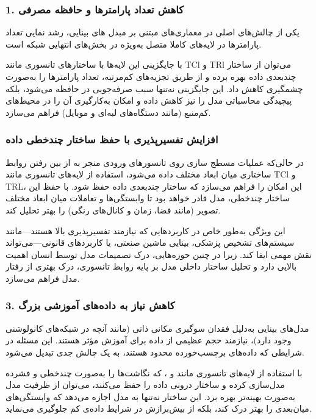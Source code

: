 \subsubsection*{1. \textbf{کاهش تعداد پارامترها و حافظه مصرفی}}

یکی از چالش‌های اصلی در معماری‌های مبتنی بر مبدل های بینایی، رشد نمایی تعداد پارامترها در لایه‌های کاملا متصل  به‌ویژه در بخش‌های انتهایی شبکه است.

با جایگزینی این لایه‌ها با ساختارهای تانسوری مانند TCl و TRl می‌توان از ساختار چندبعدی داده بهره برده و از طریق تجزیه‌های کم‌مرتبه، تعداد پارامترها را به‌صورت چشمگیری کاهش داد. این جایگزینی نه‌تنها سبب صرفه‌جویی در حافظه می‌شود، بلکه پیچیدگی محاسباتی مدل را نیز کاهش داده و امکان به‌کارگیری آن را در محیط‌های کم‌منبع (مانند دستگاه‌های لبه‌ای و موبایل) فراهم می‌سازد.


\subsubsection*{\textbf{افزایش تفسیرپذیری با حفظ ساختار چندخطی داده}}

در حالی‌که عملیات مسطج سازی روی تانسورهای ورودی منجر به از بین رفتن روابط ساختاری میان ابعاد مختلف داده می‌شود، استفاده از لایه‌های تانسوری مانند TCl و TRL، این امکان را فراهم می‌سازد که ساختار چندبعدی داده حفظ شود. با حفظ این ساختار چندخطی، مدل قادر خواهد بود تا وابستگی‌ها و تعاملات میان ابعاد مختلف تصویر (مانند فضا، زمان و کانال‌های رنگی) را بهتر تحلیل کند.

این ویژگی به‌طور خاص در کاربردهایی که نیازمند تفسیرپذیری بالا هستند—مانند سیستم‌های تشخیص پزشکی، بینایی ماشین صنعتی، یا کاربردهای قانونی—می‌تواند نقش مهمی ایفا کند. زیرا در چنین حوزه‌هایی، درک تصمیمات مدل توسط انسان اهمیت بالایی دارد و تحلیل ساختار داخلی مدل بر پایه روابط تانسوری، درک بهتری از رفتار مدل فراهم می‌سازد.


\subsubsection*{3. \textbf{کاهش نیاز به داده‌های آموزشی بزرگ}}

مدل‌های بینایی به‌دلیل فقدان سوگیری مکانی ذاتی (مانند آنچه در شبکه‌های کانولوشنی وجود دارد)، نیازمند حجم عظیمی از داده برای آموزش مؤثر هستند. این مسئله در شرایطی که داده‌های برچسب‌خورده محدود هستند، به یک چالش جدی تبدیل می‌شود.

با استفاده از لایه‌های تانسوری مانند  و ، که نگاشت‌ها را به‌صورت چندخطی و فشرده مدل‌سازی کرده و ساختار درونی داده را حفظ می‌کنند، می‌توان از ظرفیت مدل به‌صورت بهینه‌تر بهره برد. این ساختار نه‌تنها به مدل اجازه می‌دهد که وابستگی‌های میان‌بعدی را بهتر درک کند، بلکه از بیش‌برازش در شرایط داده‌ی کم جلوگیری می‌نماید.

